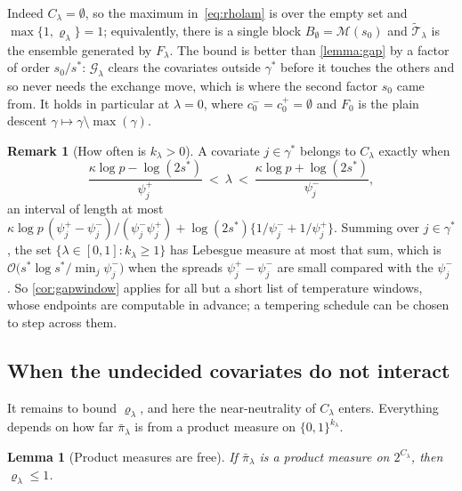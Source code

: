 \documentclass[aos]{imsart}
\theoremstyle{plain}
\newtheorem{lemma}{Lemma}[section]
\theoremstyle{definition}
\newtheorem{remark}{Remark}[section]
\begin{document}
    Indeed $C_\lambda=\emptyset$, so the maximum in~\eqref{eq:rholam} is over
    the empty set and $\max\{1,\varrho_\lambda\}=1$; equivalently, there is a
    single block $B_\emptyset=\mathscr{M}(s_0)$ and
    $\widetilde{\mathcal{T}}_\lambda$ is the ensemble generated by
    $F_\lambda$. The bound is better than \cref{lemma:gap} by a factor of
    order $s_0/s^{\ast}$: $\mathcal{G}_\lambda$ clears the covariates outside
    $\gamma^{\ast}$ before it touches the others and so never needs the
    exchange move, which is where the second factor $s_0$ came from. It holds
    in particular at $\lambda=0$, where $c^{-}_0=c^{+}_0=\emptyset$ and
    $F_0$ is the plain descent $\gamma\mapsto\gamma\setminus\max(\gamma)$.

    \begin{remark}[How often is $k_\lambda>0$]
        \label{rem:kmeasure}
        A covariate $j\in\gamma^{\ast}$ belongs to $C_\lambda$ exactly when
        \begin{equation*}
            \frac{\kappa\log p-\log(2s^{\ast})}{\psi_j^{+}}
            \ <\ \lambda\ <\
            \frac{\kappa\log p+\log(2s^{\ast})}{\psi_j^{-}} ,
        \end{equation*}
        an interval of length at most
        $\kappa\log p\,(\psi_j^{+}-\psi_j^{-})/(\psi_j^{-}\psi_j^{+})
        +\log(2s^{\ast})\{1/\psi_j^{-}+1/\psi_j^{+}\}$. Summing over
        $j\in\gamma^{\ast}$, the set $\{\lambda\in[0,1]:k_\lambda\geq1\}$ has
        Lebesgue measure at most that sum, which is
        $\mathcal{O}\bigl(s^{\ast}\log s^{\ast}/\min_j\psi_j^{-}\bigr)$ when
        the spreads $\psi_j^{+}-\psi_j^{-}$ are small compared with the
        $\psi_j^{-}$. So \cref{cor:gapwindow} applies for all
        but a short list of temperature windows, whose endpoints are
        computable in advance; a
        tempering schedule can be chosen to step across them.
    \end{remark}


    \subsection{When the undecided covariates do not interact}

    It remains to bound $\varrho_\lambda$, and here the near-neutrality of
    $C_\lambda$ enters. Everything depends on how far $\bar\pi_\lambda$ is
    from a product measure on $\{0,1\}^{k_\lambda}$.

    \begin{lemma}[Product measures are free]
        \label{lemma:prodfree}
        If $\bar\pi_\lambda$ is a product measure on
        $2^{C_\lambda}$, then $\varrho_\lambda\leq1$.
    \end{lemma}
\end{document}
